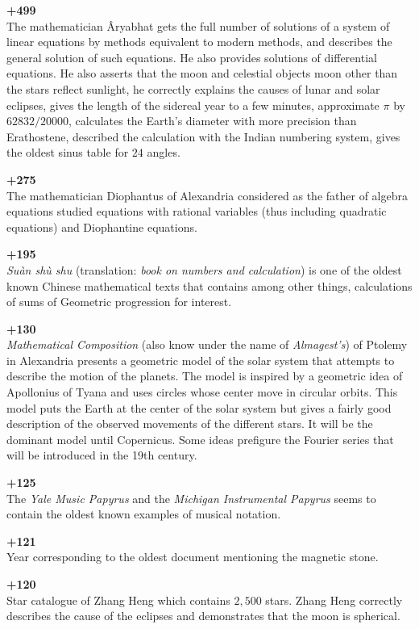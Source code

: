 \textbf{+499}\\
The mathematician Âryabhat gets the full number of solutions of a system of linear equations by methods equivalent to modern methods, and describes the general solution of such equations. He also provides solutions of differential equations. He also asserts that the moon and celestial objects moon other than the stars reflect sunlight, he correctly explains the causes of lunar and solar eclipses, gives the length of the sidereal year to a few minutes, approximate $\pi$ by $62832/20000$, calculates the Earth's diameter with more precision than Erathostene, described the calculation with the Indian numbering system, gives the oldest sinus table for $24$ angles.

\textbf{+275}\\
The mathematician Diophantus of Alexandria considered as the father of algebra equations studied equations with rational variables (thus including quadratic equations) and Diophantine equations.

\textbf{+195}\\
\textit{Suàn shù shu} (translation: \textit{book on numbers and calculation}) is one of the oldest known Chinese mathematical texts that contains among other things, calculations of sums of Geometric progression for interest.

\textbf{+130}\\
\textit{Mathematical Composition} (also know under the name of \textit{Almagest's}) of Ptolemy in Alexandria presents a geometric model of the solar system that attempts to describe the motion of the planets. The model is inspired by a geometric idea of Apollonius of Tyana and uses circles whose center move in circular orbits. This model puts the Earth at the center of the solar system but gives a fairly good description of the observed movements of the different stars. It will be the dominant model until Copernicus. Some ideas prefigure the Fourier series that will be introduced in the 19th century.

\textbf{+125}\\
The \textit{Yale Music Papyrus} and the \textit{Michigan Instrumental Papyrus} seems to contain the oldest known examples of musical notation.

\textbf{+121}\\
Year corresponding to the oldest document mentioning the magnetic stone.

\textbf{+120}\\
Star catalogue of Zhang Heng which contains $2,500$ stars. Zhang Heng correctly describes the cause of the eclipses and demonstrates that the moon is spherical.

